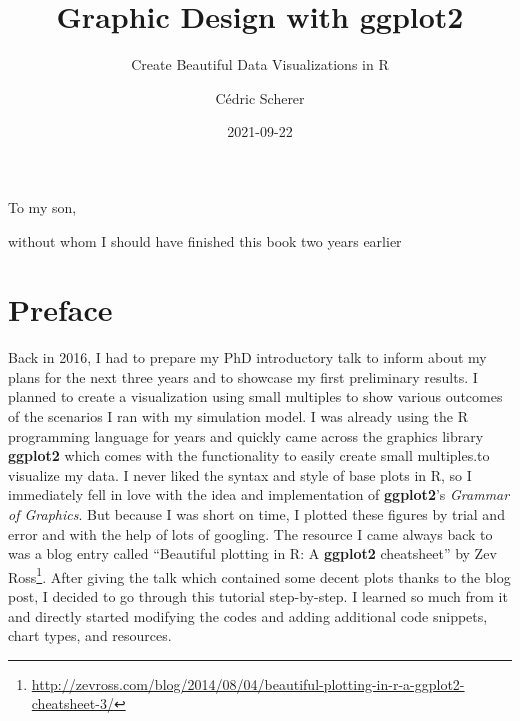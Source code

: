 \documentclass[
]{krantz}
\title{Graphic Design with ggplot2}
\subtitle{Create Beautiful Data Visualizations in R}
\author{Cédric Scherer}
\date{2021-09-22}
\renewcommand{\href}[2]{#2\footnote{\url{#1}}}
\begin{document}
\maketitle


\thispagestyle{empty}

\begin{center}
To my son,

without whom I should have finished this book two years earlier
\end{center}

\setlength{\abovedisplayskip}{-5pt}
\setlength{\abovedisplayshortskip}{-5pt}

{
\hypersetup{linkcolor=}
\setcounter{tocdepth}{2}
\tableofcontents
}
\listoftables
\listoffigures
\hypertarget{preface}{%
\chapter*{Preface}\label{preface}}


Back in 2016, I had to prepare my PhD introductory talk to inform about my plans for the next three years and to showcase my first preliminary results. I planned to create a visualization using small multiples to show various outcomes of the scenarios I ran with my simulation model. I was already using the R programming language for years and quickly came across the graphics library \textbf{ggplot2} which comes with the functionality to easily create small multiples.to visualize my data. I never liked the syntax and style of base plots in R, so I immediately fell in love with the idea and implementation of \textbf{ggplot2}'s \emph{Grammar of Graphics}. But because I was short on time, I plotted these figures by trial and error and with the help of lots of googling. The resource I came always back to was a blog entry called \href{http://zevross.com/blog/2014/08/04/beautiful-plotting-in-r-a-ggplot2-cheatsheet-3/}{``Beautiful plotting in R: A \textbf{ggplot2} cheatsheet'' by Zev Ross}. After giving the talk which contained some decent plots thanks to the blog post, I decided to go through this tutorial step-by-step. I learned so much from it and directly started modifying the codes and adding additional code snippets, chart types, and resources.
\end{document}
